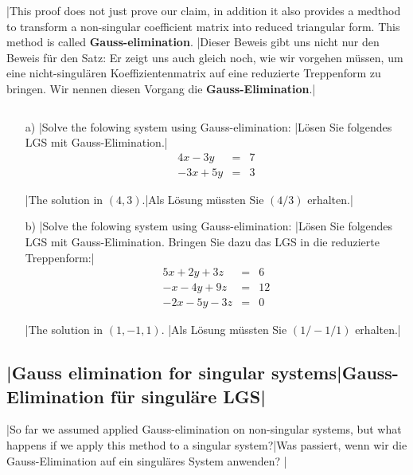\vsp\vsp

\tr|This proof does not just prove our claim, in addition it also provides a medthod to transform a non-singular coefficient matrix into reduced triangular form.
    This method is called \textbf{Gauss-elimination}.
   |Dieser Beweis gibt uns nicht nur den Beweis für den Satz: Er zeigt uns auch gleich noch, wie wir vorgehen müssen, um eine nicht-singulären Koeffizientenmatrix auf eine reduzierte Treppenform zu bringen.
    Wir nennen diesen Vorgang die \textbf{Gauss-Elimination}.|


\begin{exer}\label{exerTreppenform}$ $
\begin{itemize}
\item[a)]
  \tr|Solve the folowing system using Gauss-elimination: |Lösen Sie folgendes LGS mit Gauss-Elimination.|
\[
\begin{array}{rcl}
4x-3y&=&7\\
-3x+5y&=&3
\end{array}
\]
	 
\tr|The solution in $(4,3)$.|Als Lösung müssten Sie $(4/3)$ erhalten.|
\vfill

\item[b)]\tr|Solve the folowing system using Gauss-elimination: |Lösen Sie folgendes LGS mit Gauss-Elimination. Bringen Sie dazu das LGS in die reduzierte Treppenform:|
\[
\begin{array}{rcl}
5x+2y+3z&=&6\\
-x-4y+9z&=&12\\
-2x-5y-3z&=&0
\end{array}
\]
	
\tr|The solution in $(1,-1,1)$. |Als Lösung müssten Sie $(1/-1/1)$ erhalten.|
\vfill

\end{itemize}
\end{exer}

\newpage
\subsection{\tr|Gauss elimination for singular systems|Gauss-Elimination für singuläre LGS|}

\tr|So far we assumed applied Gauss-elimination on non-singular systems, but what happens if we apply this method to a singular system?|Was passiert, wenn wir die Gauss-Elimination auf ein singuläres System anwenden? |


